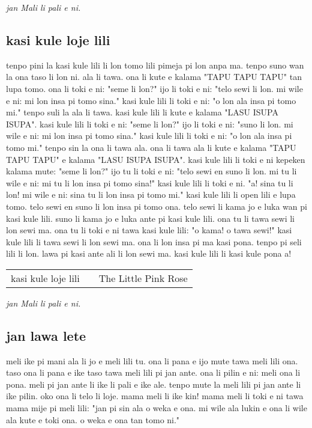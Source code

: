 \textit{jan Mali li pali e ni. \cite{www:astrodonunt:01}}

\subsection{kasi kule loje lili}

tenpo pini la kasi kule lili li lon tomo lili pimeja pi lon anpa ma. 
tenpo suno wan la ona taso li lon ni. 
ala li tawa. 
ona li kute e kalama "TAPU TAPU TAPU" tan lupa tomo.
ona li toki e ni: "seme li lon?"
ijo li toki e ni: "telo sewi li lon. 
mi wile e ni: mi lon insa pi tomo sina."
kasi kule lili li toki e ni: "o lon ala insa pi tomo mi."
tenpo suli la ala li tawa. 
kasi kule lili li kute e kalama "LASU ISUPA ISUPA".
kasi kule lili li toki e ni: "seme li lon?"
ijo li toki e ni: "suno li lon. 
mi wile e ni: mi lon insa pi tomo sina."
kasi kule lili li toki e ni: "o lon ala insa pi tomo mi." 
tenpo sin la ona li tawa ala.
ona li tawa ala li kute e kalama "TAPU TAPU TAPU" e kalama "LASU ISUPA ISUPA".
kasi kule lili li toki e ni kepeken kalama mute: "seme li lon?"
ijo tu li toki e ni: "telo sewi en suno li lon. 
mi tu li wile e ni: mi tu li lon insa pi tomo sina!"
kasi kule lili li toki e ni.
"a! 
sina tu li lon! 
mi wile e ni: sina tu li lon insa pi tomo mi."
kasi kule lili li open lili e lupa tomo. 
telo sewi en suno li lon insa pi tomo ona. 
telo sewi li kama jo e luka wan pi kasi kule lili. 
suno li kama jo e luka ante pi kasi kule lili. 
ona tu li tawa sewi li lon sewi ma. 
ona tu li toki e ni tawa kasi kule lili: "o kama! 
o tawa sewi!"
kasi kule lili li tawa sewi li lon sewi ma. 
ona li lon insa pi ma kasi pona. 
tenpo pi seli lili li lon. 
lawa pi kasi ante ali li lon sewi ma. 
kasi kule lili li kasi kule pona a!

\begin{supertabular}{p{5,5cm}|ll}
kasi kule loje lili  && The Little Pink Rose \\
\end{supertabular}

\textit{jan Mali li pali e ni. \cite{www:astrodonunt:01}}
%
\newpage
\subsection{jan lawa lete}

meli ike pi mani ala li jo e meli lili tu. 
ona li pana e ijo mute tawa meli lili ona. 
taso ona li pana e ike taso tawa meli lili pi jan ante. 
ona li pilin e ni: meli ona li pona. 
meli pi jan ante li ike li pali e ike ale. 
tenpo mute la meli lili pi jan ante li ike pilin. 
oko ona li telo li loje.  
mama meli li ike kin! 
mama meli li toki e ni tawa mama mije pi meli lili: 
"jan pi sin ala o weka e ona. 
mi wile ala lukin e ona li wile ala kute e toki ona. 
o weka e ona tan tomo ni."

